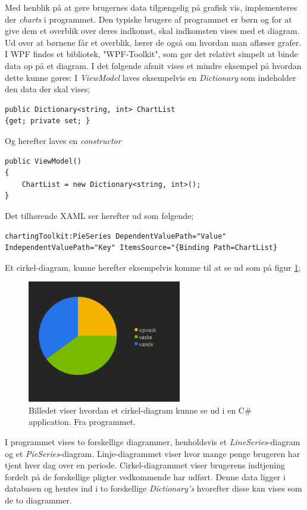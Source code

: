 Med henblik på at gøre brugernes data tilgængelig på grafisk vis, implementeres der \textit{charts} i programmet. Den typiske brugere af programmet er børn og for at give dem et overblik over deres indkomst, skal indkomsten vises med et diagram. Ud over at børnene får et overblik, lærer de også om hvordan man aflæser grafer.
I WPF findes et bibliotek, "WPF-Toolkit", som gør det relativt simpelt at binde data op på et diagram. I det følgende afsnit vises et mindre eksempel på hvordan dette kunne gøres:
I \textit{ViewModel} laves eksempelvis en \textit{Dictionary} som indeholder den data der skal vises;

\begin{lstlisting}
public Dictionary<string, int> ChartList
{get; private set; }
\end{lstlisting}

Og herefter laves en \textit{constructor}

\begin{lstlisting}
public ViewModel()
{
	ChartList = new Dictionary<string, int>();
}
\end{lstlisting}

Det tilhørende XAML ser herefter ud som følgende;

\begin{lstlisting}
chartingToolkit:PieSeries DependentValuePath="Value" IndependentValuePath="Key" ItemsSource="{Binding Path=ChartList}
\end{lstlisting}

Et cirkel-diagram, kunne herefter eksempelvis komme til at se ud som på figur \ref{cirkeldia};

\begin{figure}[H]
\centering
\includegraphics[width=0.6\textwidth]{Billeder/cirkeldia.png}
\caption{Billedet viser hvordan et cirkel-diagram kunne se ud i en C\# application. Fra programmet.}
\label{cirkeldia}
\end{figure}

I programmet vises to forskellige diagrammer, henholdsvis et \textit{LineSeries}-diagram og et \textit{PieSeries}-diagram. Linje-diagrammet viser hvor mange penge brugeren har tjent hver dag over en periode. Cirkel-diagrammet viser brugerens indtjening fordelt på de forskellige pligter vedkommende har udført. Denne data ligger i databasen og hentes ind i to forskellige \textit{Dictionary’s} hvorefter disse kan vises som de to diagrammer. 

